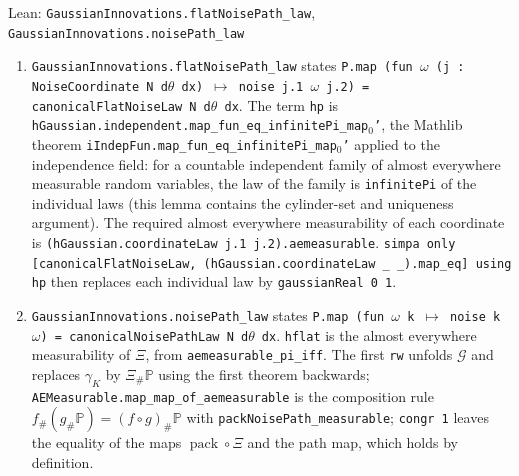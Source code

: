 \documentclass[11pt,a4paper]{report}
\begin{document}
\begin{leanbox}{Lean: \texttt{GaussianInnovations.\allowbreak{}flatNoisePath\_\allowbreak{}law}, \texttt{GaussianInnovations.\allowbreak{}noisePath\_\allowbreak{}law}}
\begin{enumerate}
\item \texttt{Gaussian\allowbreak{}Innovations.\allowbreak{}flat\allowbreak{}Noise\allowbreak{}Path\_\allowbreak{}law} states \texttt{P.\allowbreak{}map (fun \ensuremath{\omega} (j : Noise\allowbreak{}Coordinate N d\ensuremath{\theta} dx) \ensuremath{\mapsto} noise j.\allowbreak{}1 \ensuremath{\omega} j.\allowbreak{}2) = canonical\allowbreak{}Flat\allowbreak{}Noise\allowbreak{}Law N d\ensuremath{\theta} dx}. The term \texttt{hp} is \texttt{h\allowbreak{}Gaussian.\allowbreak{}independent.\allowbreak{}map\_\allowbreak{}fun\_\allowbreak{}eq\_\allowbreak{}infinite\allowbreak{}Pi\_\allowbreak{}map\ensuremath{{}_{0}}'}, the Mathlib theorem \texttt{i\allowbreak{}Indep\allowbreak{}Fun.\allowbreak{}map\_\allowbreak{}fun\_\allowbreak{}eq\_\allowbreak{}infinite\allowbreak{}Pi\_\allowbreak{}map\ensuremath{{}_{0}}'} applied to the independence field: for a countable independent family of almost everywhere measurable random variables, the law of the family is \texttt{infinite\allowbreak{}Pi} of the individual laws (this lemma contains the cylinder-set and uniqueness argument). The required almost everywhere measurability of each coordinate is \texttt{(h\allowbreak{}Gaussian.\allowbreak{}coordinate\allowbreak{}Law j.\allowbreak{}1 j.\allowbreak{}2).\allowbreak{}aemeasurable}. \texttt{simpa only [canonical\allowbreak{}Flat\allowbreak{}Noise\allowbreak{}Law, (h\allowbreak{}Gaussian.\allowbreak{}coordinate\allowbreak{}Law \_\allowbreak{} \_\allowbreak{}).\allowbreak{}map\_\allowbreak{}eq] using hp} then replaces each individual law by \texttt{gaussian\allowbreak{}Real 0 1}.

\item \texttt{Gaussian\allowbreak{}Innovations.\allowbreak{}noise\allowbreak{}Path\_\allowbreak{}law} states \texttt{P.\allowbreak{}map (fun \ensuremath{\omega} k \ensuremath{\mapsto} noise k \ensuremath{\omega}) = canonical\allowbreak{}Noise\allowbreak{}Path\allowbreak{}Law N d\ensuremath{\theta} dx}. \texttt{hflat} is the almost everywhere measurability of \(\Xi\), from \texttt{aemeasurable\_\allowbreak{}pi\_\allowbreak{}iff}. The first \texttt{rw} unfolds \(\mathcal G\) and replaces \(\gamma_K\) by \(\Xi_\#\mathbb P\) using the first theorem backwards; \texttt{AEMeasurable.\allowbreak{}map\_\allowbreak{}map\_\allowbreak{}of\_\allowbreak{}aemeasurable} is the composition rule \(f_\#(g_\#\mathbb P)=(f\circ g)_\#\mathbb P\) with \texttt{pack\allowbreak{}Noise\allowbreak{}Path\_\allowbreak{}measurable}; \texttt{congr 1} leaves the equality of the maps \(\operatorname{pack}\circ\Xi\) and the path map, which holds by definition.

\end{enumerate}
\end{leanbox}
\end{document}
